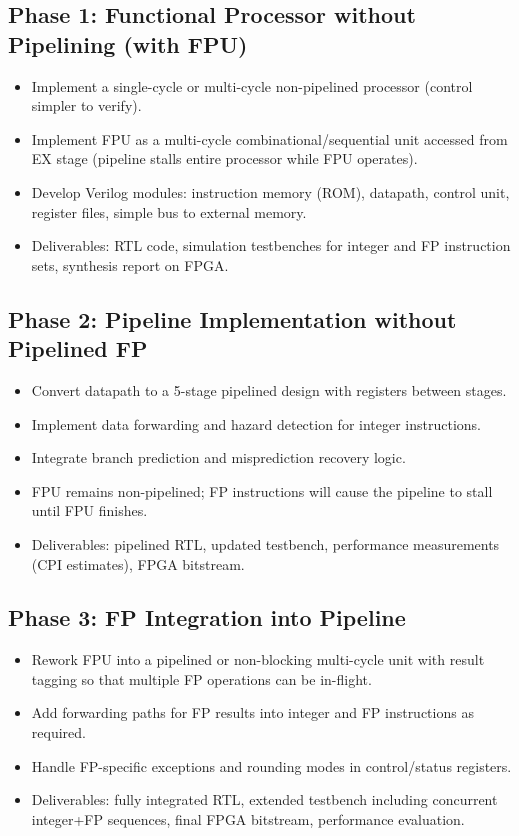 \documentclass[11pt,a4paper]{article}
\begin{document}
\subsection{Phase 1: Functional Processor without Pipelining (with FPU)}
\begin{itemize}
\item Implement a single-cycle or multi-cycle non-pipelined processor (control simpler to verify).
\item Implement FPU as a multi-cycle combinational/sequential unit accessed from EX stage (pipeline stalls entire processor while FPU operates).
\item Develop Verilog modules: instruction memory (ROM), datapath, control unit, register files, simple bus to external memory.
\item Deliverables: RTL code, simulation testbenches for integer and FP instruction sets, synthesis report on FPGA.
\end{itemize}

\subsection{Phase 2: Pipeline Implementation without Pipelined FP}
\begin{itemize}
\item Convert datapath to a 5-stage pipelined design with registers between stages.
\item Implement data forwarding and hazard detection for integer instructions.
\item Integrate branch prediction and misprediction recovery logic.
\item FPU remains non-pipelined; FP instructions will cause the pipeline to stall until FPU finishes.
\item Deliverables: pipelined RTL, updated testbench, performance measurements (CPI estimates), FPGA bitstream.
\end{itemize}

\subsection{Phase 3: FP Integration into Pipeline}
\begin{itemize}
\item Rework FPU into a pipelined or non-blocking multi-cycle unit with result tagging so that multiple FP operations can be in-flight.
\item Add forwarding paths for FP results into integer and FP instructions as required.
\item Handle FP-specific exceptions and rounding modes in control/status registers.
\item Deliverables: fully integrated RTL, extended testbench including concurrent integer+FP sequences, final FPGA bitstream, performance evaluation.
\end{itemize}
\end{document}
